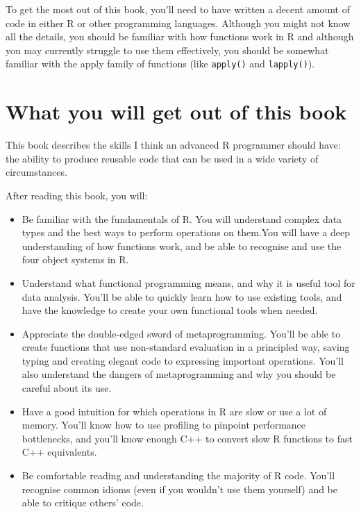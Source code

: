 To get the most out of this book, you'll need to have written a decent
amount of code in either R or other programming languages. Although you
might not know all the details, you should be familiar with how
functions work in R and although you may currently struggle to use them
effectively, you should be somewhat familiar with the apply family of
functions (like \texttt{apply()} and \texttt{lapply()}).

\section{What you will get out of this
book}\label{what-you-will-get-out-of-this-book}

This book describes the skills I think an advanced R programmer should
have: the ability to produce reusable code that can be used in a wide
variety of circumstances.

After reading this book, you will:

\begin{itemize}
\item
  Be familiar with the fundamentals of R. You will understand complex
  data types and the best ways to perform operations on them.You will
  have a deep understanding of how functions work, and be able to
  recognise and use the four object systems in R.
\item
  Understand what functional programming means, and why it is useful
  tool for data analysis. You'll be able to quickly learn how to use
  existing tools, and have the knowledge to create your own functional
  tools when needed.
\item
  Appreciate the double-edged sword of metaprogramming. You'll be able
  to create functions that use non-standard evaluation in a principled
  way, saving typing and creating elegant code to expressing important
  operations. You'll also understand the dangers of metaprogramming and
  why you should be careful about its use.
\item
  Have a good intuition for which operations in R are slow or use a lot
  of memory. You'll know how to use profiling to pinpoint performance
  bottlenecks, and you'll know enough C++ to convert slow R functions to
  fast C++ equivalents.
\item
  Be comfortable reading and understanding the majority of R code.
  You'll recognise common idioms (even if you wouldn't use them
  yourself) and be able to critique others' code.
\end{itemize}

